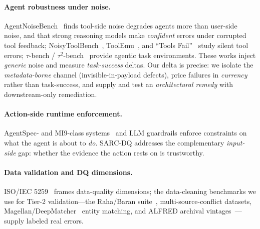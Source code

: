 \documentclass[11pt]{article}
\theoremstyle{plain}
\theoremstyle{definition}
\begin{document}
\paragraph{Agent robustness under noise.} AgentNoiseBench~\cite{agentnoisebench}
finds tool-side noise degrades agents more than user-side noise, and that strong
reasoning models make \emph{confident} errors under corrupted tool feedback;
NoisyToolBench~\cite{noisytoolbench}, ToolEmu~\cite{toolemu}, and
``Tools Fail''~\cite{toolsfail} study silent tool errors;
$\tau$-bench / $\tau^2$-bench~\cite{taubench} provide agentic task
environments. These works inject \emph{generic} noise and measure \emph{task-success}
deltas. Our delta is precise: we isolate the \emph{metadata-borne} channel
(invisible-in-payload defects), price failures in \emph{currency} rather than
task-success, and supply and test an \emph{architectural remedy} with downstream-only
remediation.
\paragraph{Action-side runtime enforcement.} AgentSpec- and
MI9-class systems~\cite{agentspec,mi9} and LLM guardrails enforce constraints on what the agent
is about to \emph{do}. SARC-DQ addresses the complementary \emph{input-side} gap:
whether the evidence the action rests on is trustworthy.
\paragraph{Data validation and DQ dimensions.} ISO/IEC 5259~\cite{iso5259}
frames data-quality dimensions; the data-cleaning benchmarks we use for Tier-2
validation---the Raha/Baran suite~\cite{raha}, multi-source-conflict
datasets, Magellan/DeepMatcher~\cite{magellan} entity matching, and ALFRED
archival vintages~\cite{alfred}---supply labeled real errors.
\end{document}
